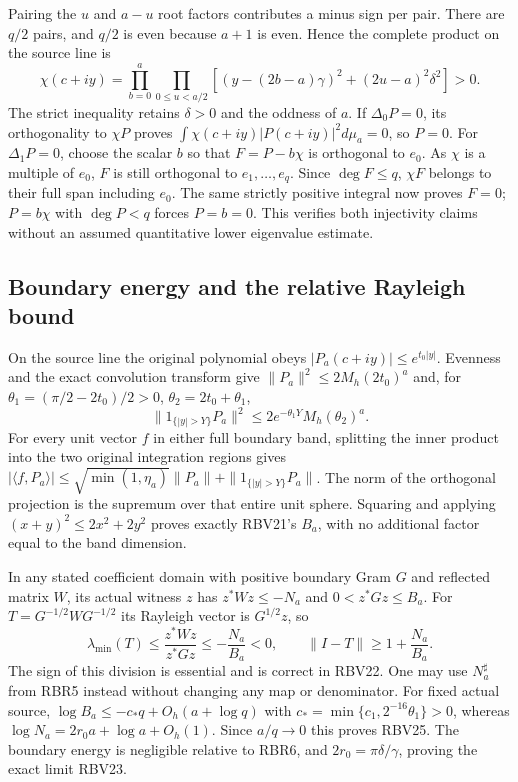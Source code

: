 Pairing the $u$ and $a-u$ root factors contributes a minus sign
per pair. There are $q/2$ pairs, and $q/2$ is even because $a+1$
is even. Hence the complete product on the source line is
\[
 \chi(c+iy)=
 \prod_{b=0}^a\prod_{0\le u<a/2}
 [(y-(2b-a)\gamma)^2+(2u-a)^2\delta^2]>0 .
 \tag{RBR11}
\]
The strict inequality retains $\delta>0$ and the oddness of $a$.
If $\Delta_0P=0$, its orthogonality to $\chi P$ proves
$\int\chi(c+iy)|P(c+iy)|^2d\mu_a=0$, so $P=0$.
For $\Delta_1P=0$, choose the scalar $b$ so that
$F=P-b\chi$ is orthogonal to $e_0$.
As $\chi$ is a multiple of $e_0$, $F$ is still orthogonal to
$e_1,\ldots,e_q$. Since $\deg F\le q$,
$\chi F$ belongs to their full span including $e_0$.
The same strictly positive integral now proves $F=0$;
$P=b\chi$ with $\deg P<q$ forces $P=b=0$.
This verifies both injectivity claims without an assumed
quantitative lower eigenvalue estimate.

\subsection{Boundary energy and the relative Rayleigh bound}

On the source line the original polynomial obeys
$|P_a(c+iy)|\le e^{t_0|y|}$.
Evenness and the exact convolution transform give
$\|P_a\|^2\le2M_h(2t_0)^a$ and, for
$\theta_1=(\pi/2-2t_0)/2>0$, $\theta_2=2t_0+\theta_1$,
\[
 \|1_{\{|y|>Y\}}P_a\|^2
       \le2e^{-\theta_1Y}M_h(\theta_2)^a.              \tag{RBR12}
\]
For every unit vector $f$ in either full boundary band,
splitting the inner product into the two original integration
regions gives
$|\langle f,P_a\rangle|
\le\sqrt{\min(1,\eta_a)}\|P_a\|
+\|1_{\{|y|>Y\}}P_a\|$.
The norm of the orthogonal projection is the supremum over
that entire unit sphere. Squaring and applying
$(x+y)^2\le2x^2+2y^2$ proves exactly RBV21's $B_a$, with
no additional factor equal to the band dimension.

In any stated coefficient domain with positive boundary Gram
$G$ and reflected matrix $W$, its actual witness $z$ has
$z^*Wz\le-N_a$ and $0<z^*Gz\le B_a$.
For $T=G^{-1/2}WG^{-1/2}$ its Rayleigh vector is
$G^{1/2}z$, so
\[
 \lambda_{\min}(T)\le
 \frac{z^*Wz}{z^*Gz}\le-\frac{N_a}{B_a}<0,\qquad
 \|I-T\|\ge1+\frac{N_a}{B_a}.                         \tag{RBR13}
\]
The sign of this division is essential and is correct in RBV22.
One may use $N_a^\sharp$ from RBR5 instead without changing
any map or denominator.
For fixed actual source,
$\log B_a\le-c_*q+O_h(a+\log q)$ with
$c_*=\min\{c_1,2^{-16}\theta_1\}>0$,
whereas $\log N_a=2r_0a+\log a+O_h(1)$.
Since $a/q\to0$ this proves RBV25.
The boundary energy is negligible relative to RBR6, and
$2r_0=\pi\delta/\gamma$, proving the exact limit RBV23.

